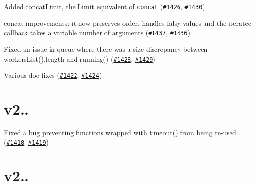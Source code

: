 
\begin{DoxyItemize}
\item Added {\ttfamily concat\+Limit}, the {\ttfamily Limit} equivalent of \href{https://caolan.github.io/async/docs.html#concat}{\tt {\ttfamily concat}} (\href{https://github.com/caolan/async/issues/1426}{\tt \#1426}, \href{https://github.com/caolan/async/pull/1430}{\tt \#1430})
\item {\ttfamily concat} improvements\+: it now preserves order, handles falsy values and the {\ttfamily iteratee} callback takes a variable number of arguments (\href{https://github.com/caolan/async/issues/1437}{\tt \#1437}, \href{https://github.com/caolan/async/pull/1436}{\tt \#1436})
\item Fixed an issue in {\ttfamily queue} where there was a size discrepancy between {\ttfamily workers\+List().length} and {\ttfamily running()} (\href{https://github.com/caolan/async/issues/1428}{\tt \#1428}, \href{https://github.com/caolan/async/pull/1429}{\tt \#1429})
\item Various doc fixes (\href{https://github.com/caolan/async/issues/1422}{\tt \#1422}, \href{https://github.com/caolan/async/pull/1424}{\tt \#1424})
\end{DoxyItemize}

\section*{v2..}


\begin{DoxyItemize}
\item Fixed a bug preventing functions wrapped with {\ttfamily timeout()} from being re-\/used. (\href{https://github.com/caolan/async/issues/1418}{\tt \#1418}, \href{https://github.com/caolan/async/issues/1419}{\tt \#1419})
\end{DoxyItemize}

\section*{v2..}


